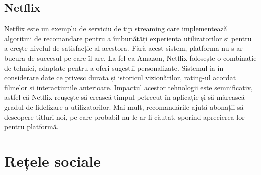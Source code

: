 \subsection*{Netflix}
Netflix este un exemplu de serviciu de tip streaming care implementează algoritmi de recomandare pentru a îmbunătăți experiența utilizatorilor și pentru a crește nivelul de satisfacție al acestora.
Fără acest sistem, platforma nu s-ar bucura de succesul pe care îl are.
La fel ca Amazon, Netflix folosește o combinație de tehnici, adaptate pentru a oferi sugestii personalizate. 
Sistemul ia în considerare date ce privesc durata și istoricul vizionărilor, rating-ul acordat filmelor și interacțiunile anterioare.
Impactul acestor tehnologii este semnificativ, astfel că Netflix reușește să crească timpul petrecut în aplicație și să mărească gradul de fidelizare a utilizatorilor.
Mai mult, recomandările ajută abonații să descopere titluri noi, pe care probabil nu le-ar fi căutat, sporind aprecierea lor pentru platformă\cite{chiny2022netflix, gomez2015netflix}.

\section{Rețele sociale}
\label{sec:ch2sec2}
